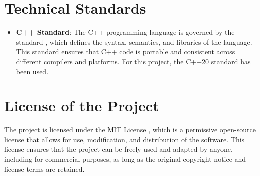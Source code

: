 \section{Technical Standards}
\begin{itemize}
    \item \textbf{C++ Standard}: The C++ programming language is governed by the standard \cite{cpp-standard}, which defines the syntax, semantics, and libraries of the language. This standard ensures that C++ code is portable and consistent across different compilers and platforms. For this project, the C++20 standard \cite{cpp20-standard} has been used.
\end{itemize}

\section{License of the Project}
The project is licensed under the MIT License \cite{mit-license}, which is a permissive open-source license that allows for use, modification, and distribution of the software. This license ensures that the project can be freely used and adapted by anyone, including for commercial purposes, as long as the original copyright notice and license terms are retained.


